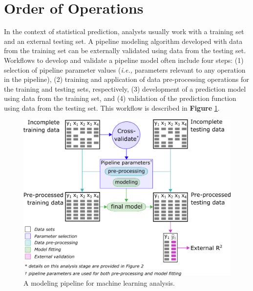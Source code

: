 \documentclass[AMA,STIX1COL,doublespace]{WileyNJD-v2}
\begin{document}
\section{Order of Operations} \label{sec:oop}

In the context of statistical prediction, analysts usually work with a
training set and an external testing set. A pipeline modeling algorithm
developed with data from the training set can be externally validated
using data from the testing set. Workflows to develop and validate a
pipeline model often include four steps: (1) selection of pipeline
parameter values (\textit{i.e., }parameters relevant to any operation in
the pipeline), (2) training and application of data pre-processing
operations for the training and testing sets, respectively, (3)
development of a prediction model using data from the training set, and
(4) validation of the prediction function using data from the testing
set. This workflow is described in \textbf{Figure}
\ref{fig:workflow_ml}.

\begin{figure}
\includegraphics[width=1\linewidth]{figs/workflow_ML} 
\caption{A modeling pipeline for machine learning analysis.}
\label{fig:workflow_ml}
\end{figure}
\end{document}
